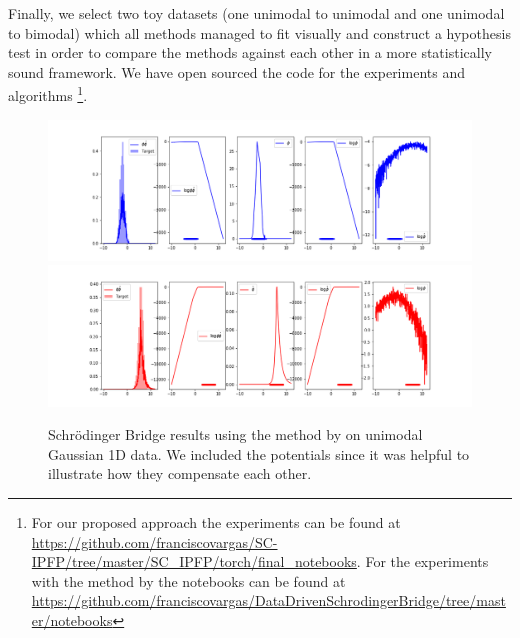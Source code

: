 \documentclass[a4paper,12pt,twoside,openright]{report}
\theoremstyle{definition}
\begin{document}
Finally, we select two toy datasets (one unimodal to unimodal and one unimodal to bimodal) which all methods managed to fit visually and construct a hypothesis test in order to compare the methods against each other in a more statistically sound framework.  We have open sourced the code for the experiments and algorithms \footnote{For our proposed approach the experiments can be found at \url{https://github.com/franciscovargas/SC-IPFP/tree/master/SC_IPFP/torch/final_notebooks}. For the experiments with the method by \cite{pavon2018data} the notebooks can be found at \url{https://github.com/franciscovargas/DataDrivenSchrodingerBridge/tree/master/notebooks}}.
\begin{figure}[t]
    \centering
    \includegraphics[scale=0.4,trim={2.3cm 0.2cm 1.5cm 0}, clip]{images/Pavon/Forward_unimodal_working_pavon_relu_nn500.png}\\\vspace{-0.2cm}
    \includegraphics[scale=0.4,trim={2.3cm 0 1.5cm 1.5cm}, clip]{images/Pavon/Backward_unimodal_working_pavon_relu_nn500.png} 
    \caption{Schrödinger Bridge results using the method by \cite{pavon2018data} on unimodal Gaussian 1D data. We included the potentials since it was helpful to illustrate how they compensate each other. }
    \label{fig:driftpavon}
\end{figure}
\end{document}

